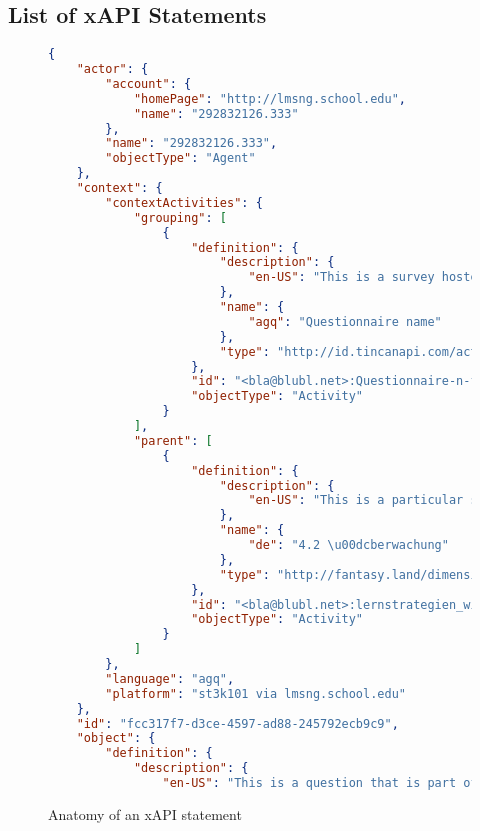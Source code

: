 \subsection{List of xAPI Statements}

\begin{figure}[H]
    \begin{lstlisting}[language=JSON]
{
    "actor": {
        "account": {
            "homePage": "http://lmsng.school.edu",
            "name": "292832126.333"
        },
        "name": "292832126.333",
        "objectType": "Agent"
    },
    "context": {
        "contextActivities": {
            "grouping": [
                {
                    "definition": {
                        "description": {
                            "en-US": "This is a survey hosted at st3k101."
                        },
                        "name": {
                            "agq": "Questionnaire name"
                        },
                        "type": "http://id.tincanapi.com/activitytype/survey"
                    },
                    "id": "<bla@blubl.net>:Questionnaire-n-f7f705a0c1",
                    "objectType": "Activity"
                }
            ],
            "parent": [
                {
                    "definition": {
                        "description": {
                            "en-US": "This is a particular scale of a survey, it usually contains multiple questions."
                        },
                        "name": {
                            "de": "4.2 \u00dcberwachung"
                        },
                        "type": "http://fantasy.land/dimension"
                    },
                    "id": "<bla@blubl.net>:lernstrategien_wild_schiefele--4_2_&#252;berwachung",
                    "objectType": "Activity"
                }
            ]
        },
        "language": "agq",
        "platform": "st3k101 via lmsng.school.edu"
    },
    "id": "fcc317f7-d3ce-4597-ad88-245792ecb9c9",
    "object": {
        "definition": {
            "description": {
                "en-US": "This is a question that is part of a survey at st3k101."
    \end{lstlisting}
    \caption{Anatomy of an xAPI statement}
    \label{fig:anatomy-xapi-statement}
\end{figure}

